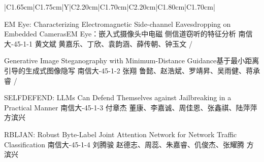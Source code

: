 





\Needspace{7.5cm}
\begin{tabularx}{\textwidth}{|C{1.65cm}|C{1.75cm}|Y|C{2.20cm}|C{1.70cm}|C{2.20cm}|C{1.80cm}|C{1.70cm}|}
\HeaderRow

{EM Eye: Characterizing Electromagnetic
Side-channel Eavesdropping on Embedded Cameras\newline EM Eye：嵌入式摄像头中电磁
侧信道窃听的特征分析}
{南信大-45-1-1}
{黄文斌}
{黄嘉乐、丁欣、袁韵涵、薛传朝、钟玉文}
{}{/}

{Generative Image Steganography with  Minimum-Distance Guidance\newline 基于最小距离引导的生成式图像隐写}
{南信大-45-1-2}
{张翔}
{鲁懿、赵浩斌、罗靖昇、吴雨健、蒋承睿}
{}{/}


{SELFDEFEND: LLMs Can Defend Themselves against Jailbreaking in a Practical Manner\newline }
{南信大-45-1-3}
{付章杰}
{董康、李嘉诚、周佳恩、张鑫祺、陆萍萍}
{}{方滨兴}

{RBLJAN: Robust Byte-Label Joint Attention Network for Network Traffic Classification\newline}
{南信大-45-1-4}
{刘腾骏}
{赵德志、周蕊、朱嘉睿、仉俊杰、张耀腾}
{}{方滨兴}
\end{tabularx}
\BlockGap





